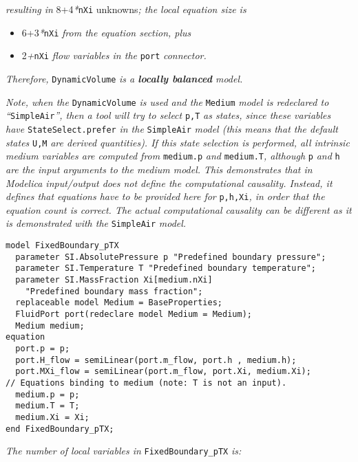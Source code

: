 \emph{resulting in} 8+4\emph{*}\lstinline!nXi! unknowns\emph{; the local equation
size is }

\begin{itemize}
\item
  6+3\emph{*}\lstinline!nXi! \emph{from the equation section, plus}
\item
  2\emph{+}\lstinline!nXi! \emph{flow variables in the} \lstinline!port! \emph{connector. }
\end{itemize}

\emph{Therefore,} \lstinline!DynamicVolume! \emph{is a \textbf{locally balanced}
model.}

\emph{Note, when the} \lstinline!DynamicVolume! \emph{is used and the} \lstinline!Medium!
\emph{model is redeclared to ``}\lstinline!SimpleAir!\emph{'', then a tool will try
to select} \lstinline!p,T! \emph{as states, since these variables have}
\lstinline!StateSelect.prefer! \emph{in the} \lstinline!SimpleAir! \emph{model (this means that
the default states} \lstinline!U,M! \emph{are derived quantities). If this state
selection is performed, all intrinsic medium variables are computed
from} \lstinline!medium.p! \emph{and} \lstinline!medium.T!\emph{, although} 
\lstinline!p! \emph{and} \lstinline!h!
\emph{are the input arguments to the medium model. This demonstrates
that in Modelica input/output does not define the computational
causality. Instead, it defines that equations have to be provided here
for} \lstinline!p,h,Xi!\emph{, in order that the equation count is correct. The
actual computational causality can be different as it is demonstrated
with the} \lstinline!SimpleAir! \emph{model.}

\begin{lstlisting}[language=modelica]
model FixedBoundary_pTX
  parameter SI.AbsolutePressure p "Predefined boundary pressure";
  parameter SI.Temperature T "Predefined boundary temperature";
  parameter SI.MassFraction Xi[medium.nXi]
    "Predefined boundary mass fraction";
  replaceable model Medium = BaseProperties;
  FluidPort port(redeclare model Medium = Medium);
  Medium medium;
equation
  port.p = p;
  port.H_flow = semiLinear(port.m_flow, port.h , medium.h);
  port.MXi_flow = semiLinear(port.m_flow, port.Xi, medium.Xi);
// Equations binding to medium (note: T is not an input).
  medium.p = p;
  medium.T = T;
  medium.Xi = Xi;
end FixedBoundary_pTX;
\end{lstlisting}

\emph{The number of local variables in} \lstinline!FixedBoundary_pTX! \emph{is:}

